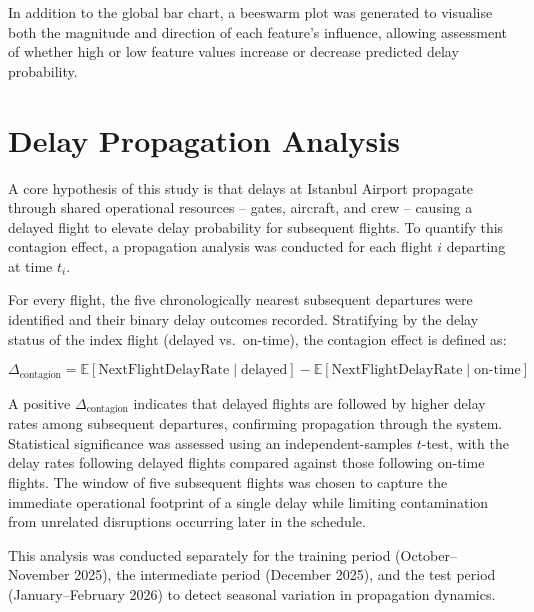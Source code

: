 \documentclass{report}
\begin{document}
In addition to the global bar chart, a beeswarm plot was generated to
visualise both the magnitude and direction of each feature's influence,
allowing assessment of whether high or low feature values increase or
decrease predicted delay probability.


\section{Delay Propagation Analysis}
\label{sec:prop_method}

A core hypothesis of this study is that delays at Istanbul Airport propagate
through shared operational resources -- gates, aircraft, and crew -- causing
a delayed flight to elevate delay probability for subsequent flights.  To
quantify this contagion effect, a propagation analysis was conducted for each
flight $i$ departing at time $t_i$.

For every flight, the five chronologically nearest subsequent departures were
identified and their binary delay outcomes recorded.  Stratifying by the
delay status of the index flight (delayed vs.\ on-time), the contagion effect
is defined as:

\begin{equation}
\Delta_{\text{contagion}} =
\mathbb{E}[\text{NextFlightDelayRate} \mid \text{delayed}] -
\mathbb{E}[\text{NextFlightDelayRate} \mid \text{on-time}]
\label{eq:contagion}
\end{equation}

A positive $\Delta_{\text{contagion}}$ indicates that delayed flights are
followed by higher delay rates among subsequent departures, confirming
propagation through the system.  Statistical significance was assessed using
an independent-samples $t$-test, with the delay rates following delayed
flights compared against those following on-time flights.  The window of five
subsequent flights was chosen to capture the immediate operational footprint
of a single delay while limiting contamination from unrelated disruptions
occurring later in the schedule.

This analysis was conducted separately for the training period
(October--November 2025), the intermediate period (December 2025), and the
test period (January--February 2026) to detect seasonal variation in
propagation dynamics.


\end{document}
